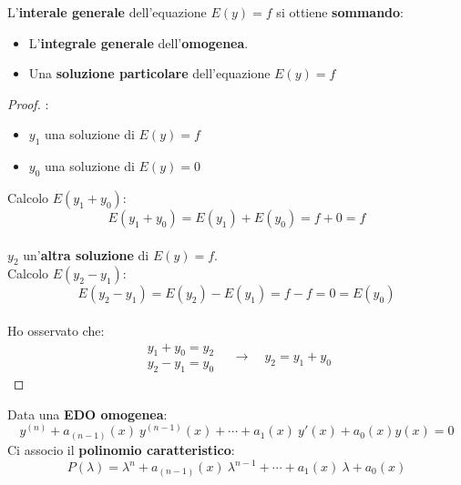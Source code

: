 \documentclass[a4paper, oneside]{article}
\begin{document}
    \begin{theorem}
        L'\textbf{interale generale} dell'equazione $E(y) = f$ si ottiene \textbf{sommando}:
        \begin{itemize}
            \item L'\textbf{integrale generale} dell'\textbf{omogenea}. 
            \item Una \textbf{soluzione particolare} dell'equazione $E(y) = f$
        \end{itemize}

        \begin{proof}
            :
            \begin{itemize}
                \item $y_1$ una soluzione di $E(y) = f$
                \item $y_0$ una soluzione di $E(y) = 0$
            \end{itemize}
            Calcolo $E(y_1+y_0)$:
            \[E(y_1+y_0) = E(y_1) + E(y_0) = f+0=f\]\\
             $y_2$ un'\textbf{altra soluzione} di $E(y) = f$.\\
            Calcolo $E(y_2-y_1)$:
            \[E(y_2-y_1) = E(y_2) - E(y_1) = f-f = 0 = E(y_0)\]\\
            Ho osservato che:
            \[\begin{matrix}
                y_1+y_0=y_2\\
                y_2-y_1=y_0
            \end{matrix} \quad\longrightarrow\quad y_2=y_1+y_0\]
        \end{proof}
    \end{theorem}

    \begin{definition}
        Data una \textbf{EDO omogenea}:
        \[y^{(n)} + a_{(n-1)}(x) \ y^{(n-1)}(x) + \cdots + a_1(x) \ y'(x) + a_0(x)y(x) = 0\]
        Ci associo il \textbf{polinomio caratteristico}:
        \[P(\lambda) = \lambda^n + a_{(n-1)}(x) \ \lambda^{n-1} + \cdots + a_1(x) \ \lambda + a_0(x)\]
    \end{definition}
\end{document}
